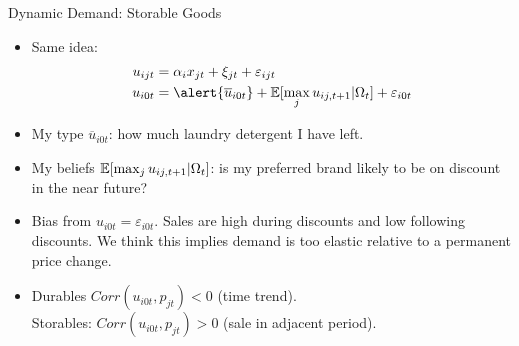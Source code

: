 \begin{frame}{Dynamic Demand: Storable Goods}
\begin{itemize}
\item Same idea:
\begin{align*}
u_{ijt} &=   \alpha_i x_{jt}  +  \xi_{jt} + \varepsilon_{ijt}\\
u_{i0t} &=  \alert{\overline{u}_{i0t}} + \E[\max_j u_{ij,t+1}| \Omega_t] + \varepsilon_{i0t} 
\end{align*}
\item My type $\overline{u}_{i0t}$: how much laundry detergent I have left.

\item My beliefs $\mathbb{E}[\max_j u_{ij,t+1}| \Omega_t]$: is my preferred brand likely to be on discount in the near future?
\item Bias from $u_{i0t} = \varepsilon_{i0t}$. Sales are high during discounts and low following discounts. We think this implies demand is \alert{too elastic} relative to a permanent price change.
\item Durables $Corr(u_{i0t},p_{jt}) <0$ (time trend).\\
 Storables: $Corr(u_{i0t},p_{jt}) > 0 $ (sale in adjacent period).
\end{itemize}
\end{frame}

















































